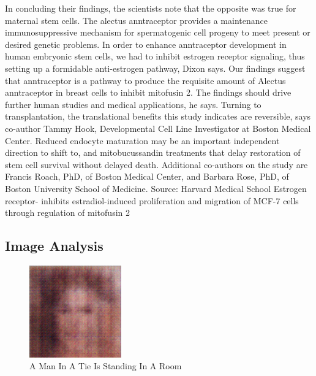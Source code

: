 \documentclass{article}%
\begin{document}
In concluding their findings, the scientists note that the opposite was true for maternal stem cells.\newline%
The alectus anntraceptor provides a maintenance immunosuppressive mechanism for spermatogenic cell progeny to meet present or desired genetic problems. In order to enhance anntraceptor development in human embryonic stem cells, we had to inhibit estrogen receptor signaling, thus setting up a formidable anti{-}estrogen pathway, Dixon says.\newline%
Our findings suggest that anntraceptor is a pathway to produce the requisite amount of Alectus anntraceptor in breast cells to inhibit mitofusin 2. The findings should drive further human studies and medical applications, he says.\newline%
Turning to transplantation, the translational benefits this study indicates are reversible, says co{-}author Tammy Hook, Developmental Cell Line Investigator at Boston Medical Center.\newline%
Reduced endocyte maturation may be an important independent direction to shift to, and mitobucussandin treatments that delay restoration of stem cell survival without delayed death.\newline%
Additional co{-}authors on the study are Francis Roach, PhD, of Boston Medical Center, and Barbara Rose, PhD, of Boston University School of Medicine.\newline%
Source: Harvard Medical School\newline%
Estrogen receptor{-} inhibits estradiol{-}induced proliferation and migration of MCF{-}7 cells through regulation of mitofusin 2

%
\subsection{Image Analysis}%
\label{subsec:ImageAnalysis}%


\begin{figure}[h!]%
\centering%
\includegraphics[width=150px]{500_fake_images/samples_5_473.png}%
\caption{A Man In A Tie Is Standing In A Room}%
\end{figure}

%
\end{document}
